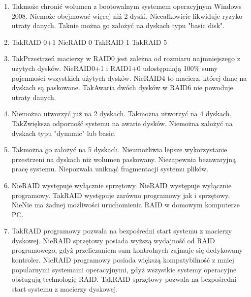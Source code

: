 \begin{enumerate}
		{Nie}{konfiguracja typu stripped volume}%
		{Tak}{konfiguracja typu RAID 5}%
		{Tak}{konfiguracja typu mirror}%
		{Nie}{konfiguracja typu spanned volume}
		\item {}%
		{Tak}{może chronić wolumen z bootowalnym systemem operacyjnym Windows 2008.}%
		{Nie}{może obejmować więcej niż 2 dyski.}%
		{Nie}{całkowicie likwiduje ryzyko utraty danych.}%
		{Tak}{nie można go założyć na dyskach typu "basic disk".}
		\item {}%
		{Tak}{RAID 0+1}%
		{Nie}{RAID 0}%
		{Tak}{RAID 1}%
		{Tak}{RAID 5}
		\item {}%
		{Tak}{Przestrzeń macierzy w RAID0 jest zależna od rozmiaru najmniejszego z użytych dysków.}%
		{Nie}{RAID0+1 i RAID1+0 udostępniają 100\% sumy pojemności wszystkich użytych dysków.}%
		{Nie}{RAID4 to macierz, której dane na dyskach są paskowane.}%
		{Tak}{Awaria dwóch dysków w RAID6 nie powoduje utraty danych.}
		\item {}%
		{Nie}{można utworzyć już na 2 dyskach.}%
		{Tak}{można utworzyć na 4 dyskach.}%
		{Tak}{Zwiększa odporność systemu na awarie dysków.}%
		{Nie}{można założyć na dyskach typu "dynamic" lub basic.}
		\item {}%
		{Tak}{można go założyć na 5 dyskach.}%
		{Nie}{umożliwia lepsze wykorzystanie przestrzeni na dyskach niż wolumen paskowany.}%
		{Nie}{zapewnia bezawaryjną pracę systemu.}%
		{Nie}{pozwala uniknąć fragmentacji systemu plików.}
		\item {}%
		{Nie}{RAID występuje wyłącznie sprzętowy.}%
		{Nie}{RAID występuje wyłącznie programowy.}%
		{Tak}{RAID występuje zarówno programowy jak i sprzętowy.}%
		{Nie}{Nie ma żadnej możliwości uruchomienia RAID w domowym komputerze PC.}
		\item {}%
		{Tak}{RAID programowy pozwala na bezpośredni start systemu z macierzy dyskowej.}%
		{Nie}{RAID sprzętowy posiada wyższą wydajność od RAID programowego, gdyż przeliczaniem sum kontrolnych zajmuje się dedykowany kontroler.}%
		{Nie}{RAID programowy posiada większą kompatybilność z mniej popularnymi systemami operacyjnymi, gdyż wszystkie systemy operacyjne obsługują technologię RAID.}%
		{Tak}{RAID sprzętowy pozwala na bezpośredni start systemu z macierzy dyskowej.}
		
		
	\end{enumerate}